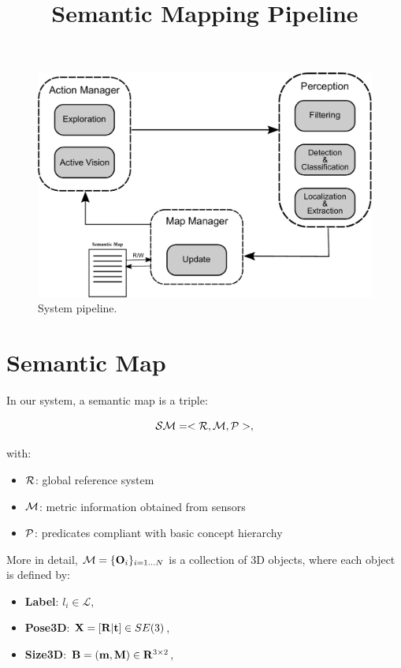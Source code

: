 \documentclass{article}
\title{\LARGE \bf Semantic Mapping Pipeline}
\begin{document}
	
	\maketitle	
	
	\begin{figure}[htbp]
		\centering
		\includegraphics[width=\linewidth]{pics/drawing-crop.pdf}
		\caption{System pipeline.}
		\label{fig:pipeline}
	\end{figure}
	
	\section{Semantic Map}
	
	In our system, a semantic map is a triple:
	
	\begin{equation}
		\mathcal{SM} = < \mathcal{R}, \mathcal{M}, \mathcal{P} >,
	\end{equation}
	
	\noindent
	with:
	
	\begin{itemize}
		\item $\mathcal{R}$: global reference system
		\item $\mathcal{M}$: metric information obtained from sensors
		\item $\mathcal{P}$: predicates compliant with basic concept hierarchy
	\end{itemize}
	
	More in detail, $\mathcal{M} = \{\mathbf{O}_i\}_{i=1 \dots N}$ is a collection of 3D objects, where each object is defined by:
	
	\begin{itemize}
		\item {\bf Label}: $l_i \in \mathcal{L}$,
		\item {\bf Pose3D}: $\mathbf{X} = [ \mathbf{R} | \mathbf{t}] \in SE(3)$,
		\item {\bf Size3D}: $\mathbf{B} = (\mathbf{m} ,\mathbf{M}) \in \mathbf{R}^{3 \times 2}$,
	\end{itemize}
	
\end{document}
